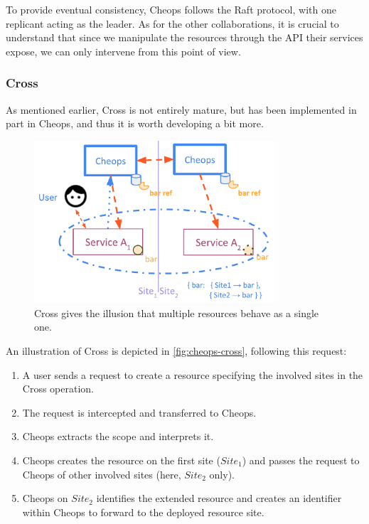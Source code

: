 To provide eventual consistency, Cheops follows the Raft protocol,
with one replicant acting as the leader.
%
As for the other collaborations, it is crucial to understand that
since we manipulate the resources through the API their services
expose, we can only intervene from this point of view.
%



\subsubsection{Cross}


As mentioned earlier, Cross is not entirely mature, but has been
implemented in part in Cheops, and thus it is worth developing a bit
more.

\begin{figure}[hbtp]
  \centering
  \includegraphics[width=0.8\textwidth]{figs/pdf/cheops-cross}
  \caption{Cross gives the illusion that multiple resources behave as
    a single one.}
  \label{fig:cheops-cross}
\end{figure}

%
An illustration of Cross is depicted in \autoref{fig:cheops-cross},
following this request:


\begin{enumerate}
\item A user sends a request to create a resource specifying the
  involved sites in the Cross operation.
\item The request is intercepted and transferred to Cheops.
\item Cheops extracts the scope and interprets it.
\item Cheops creates the resource on the first site ($Site_1$) and
  passes the request to Cheops of other involved sites (here, $Site_2$
  only).
\item Cheops on $Site_2$ identifies the extended resource and creates
  an identifier within Cheops to forward to the deployed resource site.
\end{enumerate}




